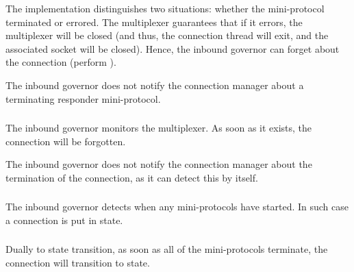 \begin{detail}
  The implementation distinguishes two situations: whether the mini-protocol
  terminated or errored.  The multiplexer guarantees that if it errors, the
  multiplexer will be closed (and thus, the connection thread will exit, and the
  associated socket will be closed).   Hence, the inbound governor can forget about the
  connection
  (perform \MuxTerminated{}).

  The inbound governor does not notify the connection manager about a terminating
  responder mini-protocol.
\end{detail}

\subsubsection{\MuxTerminated}
The inbound governor monitors the multiplexer.  As soon as it exists, the
connection will be forgotten.

The inbound governor does not notify the connection manager about the
termination of the connection, as it can detect this by itself.

\subsubsection{\PromotedToHotRemote}
The inbound governor detects when any \hot{} mini-protocols have started.   In such
case a \RemoteWarm{} connection is put in \RemoteHot{} state.

\subsubsection{\DemotedToWarmRemote}
Dually to \PromotedToHotRemote{} state transition, as soon as all of the \hot{}
mini-protocols terminate, the connection will transition to \RemoteWarm{}
state.
